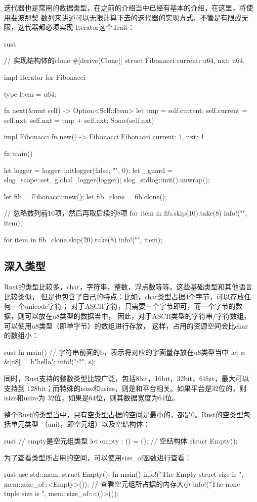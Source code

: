 迭代器也是常用的数据类型，在之前的介绍当中已经有基本的介绍，在这里，将使用斐波那契
数列来讲述可以无限计算下去的迭代器的实现方式，不管是有限或无限，迭代器都必须实现
Iterator这个Trait：
\begin{code-block}{rust}

// 实现结构体的clone
#[derive(Clone)]
struct Fibonacci {
    current: u64,
    nxt: u64,
}

impl Iterator for Fibonacci {
    type Item = u64;

    fn next(&mut self) -> Option<Self::Item> {
        let tmp = self.current;
        self.current = self.nxt;
        self.nxt = tmp + self.nxt;
        Some(self.nxt)
    }
}

impl Fibonacci {
    fn new() -> Fibonacci {
        Fibonacci { current: 1, nxt: 1 }
    }
}

fn main() {
    let logger = logger::initlogger(false, "", 0);
    let _guard = slog_scope::set_global_logger(logger);
    slog_stdlog::init().unwrap();

    let fib = Fibonacci::new();
    let fib_clone = fib.clone();

    // 忽略数列前10项，然后再取后续的8项
    for item in fib.skip(10).take(8) {
        info!("{}", item);
    }

    for item in fib_clone.skip(20).take(8) {
        info!("{}", item);
    }

}
\end{code-block}

\subsection{深入类型}
Rust的类型比较多，char，字符串，整数，浮点数等等。这些基础类型和其他语言比较类似，
但是也包含了自己的特点：比如，char类型占据4个字节，可以存放任何一个unicode字符；
对于ASCII字符，只需要一个字节即可，而一个字节的数据，则可以放在u8类型的数据当中，
因此，对于ASCII类型的字符串/字符数组，可以使用u8类型（即单字节）的数组进行存放，
这样，占用的资源空间会比char的数组小：
\begin{code-block}{rust}
fn main() {
    // 字符串前面的b，表示将对应的字面量存放在u8类型当中
    let s: &[u8] = b"hello";
    info!("{:?}", s);
}
\end{code-block}
同时，Rust支持的整数类型比较广泛，包括8bit，16bit，32bit，64bit，最大可以支持到
128bit；而特殊的isize和usize，则是和平台相关。如果平台是32位的，则isize和usize为
32位，如果是64位，则其数据宽度为64位。

整个Rust的类型当中，只有空类型占据的空间是最小的，都是0。Rust的空类型包括单元类型
（unit，即空元组）以及空结构体：
\begin{code-block}{rust}
// empty是空元组类型
let empty : () = ();
// 空结构体
struct Empty();
\end{code-block}
为了查看类型所占用的空间，可以使用size\_of函数进行查看：
\begin{code-block}{rust}
use std::mem;
struct Empty();
fn main() {
    info!("The Empty struct size is {}", mem::size_of::<Empty>());
    // 查看空元组所占据的内存大小
    info!("The none tuple size is {}", mem::size_of::<()>());
}
\end{code-block}

